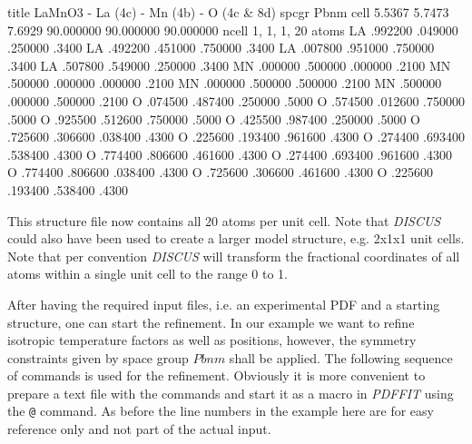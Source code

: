 \footnotesize
\begin{MacVerbatim}
  title LaMnO3 - La (4c) - Mn (4b) - O (4c & 8d)
  spcgr Pbnm
  cell   5.5367   5.7473    7.6929   90.000000   90.000000   90.000000
  ncell        1,       1,       1,        20
  atoms
  LA           .992200         .049000         .250000      .3400
  LA           .492200         .451000         .750000      .3400
  LA           .007800         .951000         .750000      .3400
  LA           .507800         .549000         .250000      .3400
  MN           .000000         .500000         .000000      .2100
  MN           .500000         .000000         .000000      .2100
  MN           .000000         .500000         .500000      .2100
  MN           .500000         .000000         .500000      .2100
  O            .074500         .487400         .250000      .5000
  O            .574500         .012600         .750000      .5000
  O            .925500         .512600         .750000      .5000
  O            .425500         .987400         .250000      .5000
  O            .725600         .306600         .038400      .4300
  O            .225600         .193400         .961600      .4300
  O            .274400         .693400         .538400      .4300
  O            .774400         .806600         .461600      .4300
  O            .274400         .693400         .961600      .4300
  O            .774400         .806600         .038400      .4300
  O            .725600         .306600         .461600      .4300
  O            .225600         .193400         .538400      .4300
\end{MacVerbatim}
\normalsize

\noindent This structure file now contains all 20 atoms per unit
cell. Note that {\it DISCUS} could also have been used to create a
larger model structure, e.g. 2x1x1 unit cells. Note that per
convention {\it DISCUS} will transform the fractional coordinates
of all atoms within a single unit cell to the range 0 to 1. \par

After having the required input files, i.e. an experimental PDF and
a starting structure, one can start the refinement. In our example
we want to refine isotropic temperature factors as well as positions,
however, the symmetry constraints given by space group $Pbnm$ shall
be applied. The following sequence of commands is used for the refinement.
Obviously it is more convenient to prepare a text file with the commands
and start it as a macro in {\it PDFFIT} using the {\tt @} command. As before
the line numbers in the example here are for easy reference only and not
part of the actual input.

